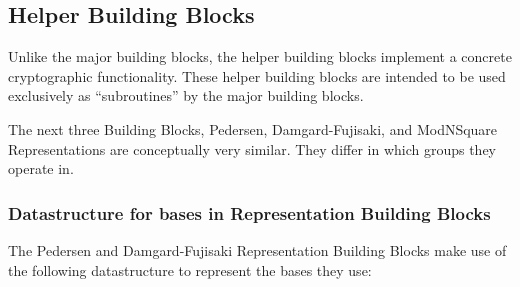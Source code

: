 
  \subsection{Helper Building Blocks}
  \label{sec:blocks:helper}
  Unlike the major building blocks, the helper building blocks implement
  a concrete cryptographic functionality. These helper building blocks
  are intended to be used exclusively as ``subroutines'' by the major building blocks.

   The next three Building Blocks, Pedersen, Damgard-Fujisaki, and ModNSquare
   Representations are conceptually very similar. They differ in which groups
   they operate in.

   \subsubsection{Datastructure for bases in Representation Building Blocks}
   The Pedersen and Damgard-Fujisaki Representation Building Blocks make
   use of the following datastructure to represent the bases they use:

